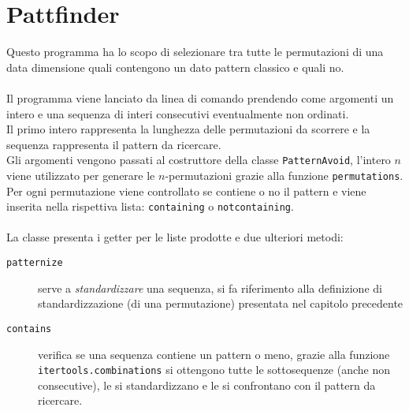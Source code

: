\section*{Pattfinder}
Questo programma ha lo scopo di selezionare tra tutte le permutazioni di una data dimensione quali contengono un dato pattern classico e quali no.\\\\
Il programma viene lanciato da linea di comando prendendo come argomenti un intero e una sequenza di interi consecutivi eventualmente non ordinati.\\
Il primo intero rappresenta la lunghezza delle permutazioni da scorrere e la sequenza rappresenta il pattern da ricercare.\\
Gli argomenti vengono passati al costruttore della classe \texttt{PatternAvoid}, l'intero $n$ viene utilizzato per generare le $n$-permutazioni grazie alla funzione \texttt{permutations}. Per ogni permutazione viene controllato se contiene o no il pattern e viene inserita nella rispettiva lista: \texttt{containing} o \texttt{notcontaining}.\\\\
La classe presenta i getter per le liste prodotte e due ulteriori metodi: 
\begin{description}
\item[\texttt{patternize}] serve a \textit{standardizzare} una sequenza, si fa riferimento alla definizione di standardizzazione (di una permutazione) presentata nel capitolo precedente
\item[\texttt{contains}] verifica se una sequenza contiene un pattern o meno, grazie alla funzione \texttt{itertools.combinations} si ottengono tutte le sottosequenze (anche non consecutive), le si standardizzano e le si confrontano con il pattern da ricercare.
\end{description}

